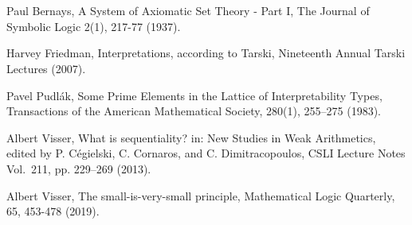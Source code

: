 \documentclass[10pt,a4paper, openany,  oldfontcommands]{memoir}
\newtheorem{open problem} [theorem] {Open Problem}
\begin{document}
\section*{ }





\begin{thebibliography}{}
Paul  Bernays,  A System of Axiomatic Set Theory - Part I,  The Journal of Symbolic Logic  2(1),  217-77   (1937).


Harvey Friedman, Interpretations, according to Tarski,   Nineteenth Annual Tarski Lectures (2007). 






 
 
 

Pavel Pudlák,  Some Prime Elements in the Lattice of Interpretability Types, 
 Transactions of the American Mathematical Society,  280(1),   255–275   (1983).





Albert Visser,  What is sequentiality? in: New Studies in Weak Arithmetics, edited by P. Cégielski, C. Cornaros, and C. Dimitracopoulos, CSLI Lecture Notes Vol.~211,  pp. 229–269   (2013).





Albert   Visser,    The small-is-very-small principle,   Mathematical  Logic Quarterly,  65,  453-478   (2019). 


\end{thebibliography}
\end{document}
